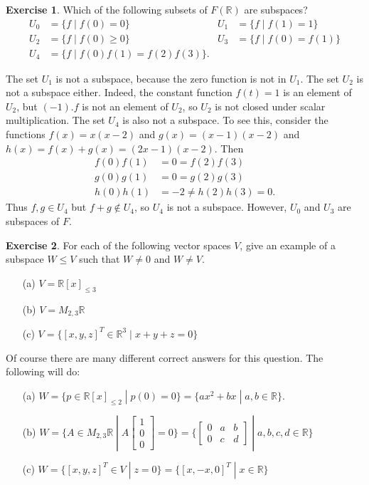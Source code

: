 \documentclass{amsart}
\newcommand{\R}         {{\mathbb{R}}}
\newcommand{\bsm}       {\left[\begin{smallmatrix}}
\newcommand{\esm}       {\end{smallmatrix}\right]}
\newcommand{\st}        {\;|\;}
\renewcommand{\:}       {\colon}
\theoremstyle{definition}
\newtheorem{exercise}{Exercise}[section]
\renewenvironment{solution}{\SolutionAtEnd}{\endSolutionAtEnd}
\begin{document}
\begin{exercise}
 Which of the following subsets of $F(\R)$ are subspaces?
 \begin{align*}
   U_0 &= \{ f \st f(0) = 0 \} &
   U_1 &= \{ f \st f(1) = 1 \} \\
   U_2 &= \{ f \st f(0) \geq 0 \} &
   U_3 &= \{ f \st f(0) = f(1) \} \\
   U_4 &= \{ f \st f(0) f(1) = f(2) f(3) \}.
 \end{align*}
\end{exercise}
\begin{solution}
 The set $U_1$ is not a subspace, because the zero function
 is not in $U_1$.  The set $U_2$ is not a subspace either.
 Indeed, the constant function $f(t)=1$ is an element of
 $U_2$, but $(-1).f$ is not an element of $U_2$, so $U_2$ is
 not closed under scalar multiplication.  The set $U_4$ is
 also not a subspace.  To see this, consider the functions
 $f(x)=x(x-2)$ and $g(x)=(x-1)(x-2)$ and
 $h(x)=f(x)+g(x)=(2x-1)(x-2)$.  Then
 \begin{align*}
  f(0)f(1) &= 0 = f(2)f(3) \\
  g(0)g(1) &= 0 = g(2)g(3) \\
  h(0)h(1) &= -2 \neq h(2)h(3) = 0.
 \end{align*}
 Thus $f,g\in U_4$ but $f+g\not\in U_4$, so $U_4$ is not a
 subspace.  However, $U_0$ and $U_3$ are subspaces of $F$.
\end{solution}
\begin{exercise}
 For each of the following vector spaces $V$, give an
 example of a subspace $W\leq V$ such that $W\neq 0$ and
 $W\neq V$.  
 \begin{itemize}
  \item[(a)] $V=\R[x]_{\leq 3}$
  \item[(b)] $V=M_{2,3}\R$
  \item[(c)] $V=\{[x,y,z]^T\in\R^3\st x+y+z=0\}$
 \end{itemize}
\end{exercise}
\begin{solution}
 Of course there are many different correct answers for this
 question.  The following will do:
 \begin{itemize}
  \item[(a)]
   $W=\{p\in \R[x]_{\leq 2}\st p(0)=0\}=\{ax^2+bx\st a,b\in\R\}$.
  \item[(b)]
   $W=\{A\in M_{2,3}\R\st A\bsm 1\\0\\0\esm = 0\}=
     \{\bsm 0&a&b\\ 0&c&d\esm \st a,b,c,d\in\R\}$
  \item[(c)]
   $W=\{[x,y,z]^T\in V\st z=0\}=\{[x,-x,0]^T\st x\in\R\}$
 \end{itemize}
\end{solution}
\end{document}
